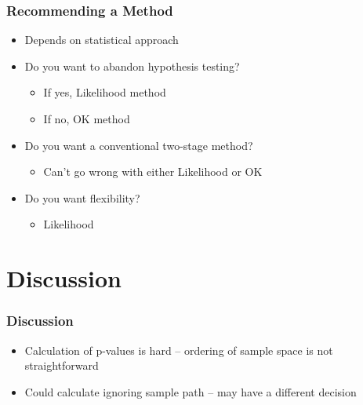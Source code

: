 \documentclass{beamer}\usepackage[]{graphicx}\usepackage[]{color}
\begin{document}
\begin{frame}
\frametitle{Recommending a Method}
    \begin{itemize}
        \item Depends on statistical approach
        \item Do you want to abandon hypothesis testing?
          \begin{itemize}
           \item If yes, Likelihood method
            \item If no, OK method %
          \end{itemize}
        \item Do you want a conventional two-stage method? 
          \begin{itemize}
            \item Can't go wrong with either Likelihood or OK
          \end{itemize}
        \item Do you want flexibility?
          \begin{itemize}
            \item Likelihood
          \end{itemize}
    \end{itemize}
\end{frame}




\section{Discussion}
\begin{frame}[t]
\frametitle{Discussion}
    \begin{itemize}
        \item Calculation of p-values is hard -- ordering of sample space is not straightforward
        \item Could calculate ignoring sample path -- may have a different decision %
    \end{itemize}
\end{frame}
\end{document}
